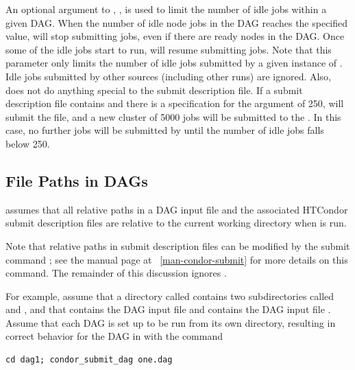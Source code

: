 An optional argument to , , 
is used to limit the number of idle jobs within a given DAG.
When the number of idle node jobs in the DAG reaches the specified
value,  will stop submitting jobs, even if there
are ready nodes in the DAG.  Once some of the idle jobs start to
run,  will resume submitting jobs.  Note that this
parameter only limits the number of idle jobs submitted by a
given instance of . Idle jobs submitted by other sources
(including other  runs) are ignored. 
Also, 
does not do anything special to the submit description file.
If a submit description file contains
 and there is a specification for the  
argument of 250, 
 will submit the file, 
and a new cluster of 5000 jobs will be submitted to the .
In this case, no further jobs will be submitted by 
until the number of idle jobs falls below 250. 

\subsection{\label{sec:DAGPaths}File Paths in DAGs}

 assumes that all relative paths in a
DAG input file and the associated HTCondor submit description files
are relative to the current
working directory when  is run.  

Note that 
relative paths in submit description files can be modified by the submit command
; 
see the  manual page at ~\ref{man-condor-submit} 
for more details on this command.
The remainder of this discussion ignores .

For example, assume that a directory called 
contains two subdirectories called  and
, and that  contains the DAG input file 
and  contains the DAG input file .
Assume that each DAG is set up to be run
from its own directory, resulting in correct behavior for the DAG
in  with the command
\begin{verbatim}
cd dag1; condor_submit_dag one.dag
\end{verbatim}

